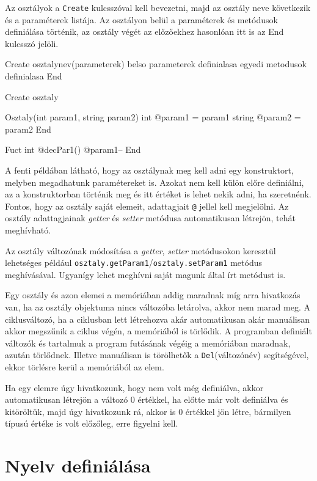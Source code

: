 Az osztályok a \texttt{Create} kulcsszóval kell bevezetni, majd az osztály neve következik és a paraméterek listája. Az osztályon belül a paraméterek és metódusok definiálása történik, az osztály végét az előzőekhez hasonlóan itt is az End kulcsszó jelöli.
\begin{cpp}
Create osztalynev(parameterek)
	belso parameterek definialasa
	egyedi metodusok definialasa
End
\end{cpp}

\begin{cpp}
Create osztaly
	
	Osztaly(int param1, string param2)
		int @param1 = param1
		string @param2 = param2
	End
		
	Fuct int @decPar1()
		@param1--
	End
\end{cpp}

A fenti példában látható, hogy az osztálynak meg kell adni egy konstruktort, melyben megadhatunk paramétereket is. Azokat nem kell külön előre definiálni, az a konstruktorban történik meg és itt értéket is lehet nekik adni, ha szeretnénk. Fontos, hogy az osztály saját elemeit, adattagjait \texttt{@} jellel kell megjelölni. Az osztály adattagjainak \textit{getter} és \textit{setter} metódusa automatikusan létrejön, tehát meghívható.

Az osztály változónak módosítása a \textit{getter}, \textit{setter} metódusokon keresztül lehetséges például \texttt{osztaly.getParam1}/\texttt{osztaly.setParam1} metódus meghívásával. Ugyanígy lehet meghívni saját magunk által írt metódust is.

Egy osztály és azon elemei a memóriában addig maradnak míg arra hivatkozás van, ha az osztály objektuma nincs változóba letárolva, akkor nem marad meg. A ciklusváltozó, ha a ciklusban lett létrehozva akár automatikusan akár manuálisan akkor megszűnik a ciklus végén, a memóriából is törlődik. A programban definiált változók és tartalmuk a program futásának végéig a memóriában maradnak, azután törlődnek. Illetve manuálisan is törölhetők a \texttt{Del}(változónév) segítségével, ekkor törlésre kerül a memóriából az elem.

Ha egy elemre úgy hivatkozunk, hogy nem volt még definiálva, akkor automatikusan létrejön a változó 0 értékkel, ha előtte már volt definiálva és kitöröltük, majd úgy hivatkozunk rá, akkor is 0 értékkel jön létre, bármilyen típusú értéke is volt előzőleg, erre figyelni kell.

\section{Nyelv definiálása}

